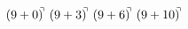 \documentclass[preview]{standalone}
\begin{document}
\begin{align*}
(9+0)^{\hspace{-0.1cm}\urcorner} \ (9+3)^{\hspace{-0.1cm}\urcorner} \ (9+6)^{\hspace{-0.1cm}\urcorner} \ (9+10)^{\hspace{-0.1cm}\urcorner}
\end{align*}
\end{document}
